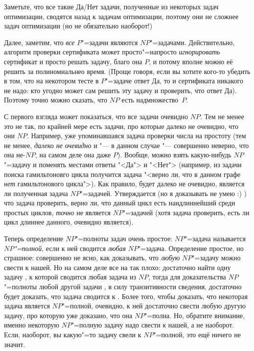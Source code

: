 {Заметьте, что все такие Да/Нет задачи, полученные из некоторых задач 
оптимизации, сводятся назад к задачам оптимизации, поэтому они не сложнее задач 
оптимизации (но не обязательно наоборот!)

Далее, заметим, что \textit{все} $P$"=задачи являются $NP$"=задачами. 
Действительно, алгоритм проверки сертификата может просто"=напросто 
\textit{игнорировать} сертификат и просто решать задачу, благо она $P$, и 
потому вполне можно её решить за полиномиальнео время. (Проще говоря, если вы 
хотите кого-то убедить в том, что на некотором тесте в $P$"=задаче ответ Да, то 
и сертификата никакого не надо: кто угодно может сам решить эту задачу и 
проверить, что ответ Да). Поэтому точно можно сказать, что $NP$ есть 
надмножество~$P$.

 С первого взгляда может показаться, что все 
задачи очевидно $NP$. Тем не менее это не так, по крайней мере есть задачи, про 
которые далеко не очевидно, что они $NP$. Например, уже упоминавшаяся задача 
проверки числа на простоту (тем не менее, \textit{далеко не очевидно} и "--- в 
данном случае "--- совершенно неверно, что она не-$NP$, на самом деле она даже $P$). 
Вообще, можно взять 
какую-нибудь $NP$"=задачу и поменять местами ответы "<Да"> и "<Нет"> 
(например, из задачи поиска гамильтоновго цикла получится задача "<верно ли, что 
в данном графе \textit{нет} гамильтонового цикла">). Как 
правило, будет далеко не очевидно, является ли полученная задача $NP$"=задачей. 
Утверждается (но я доказывать не умею :) ) что задача проверить, 
верно ли, что данный цикл есть наидлиннейший среди простых циклов, 
\textit{точно} не является $NP$"=задачей (хотя задача проверить, есть ли цикл 
длиннее данного, очевидно является).

 Теперь определение $NP$"=полноты задач очень простое: 
$NP$"=задача называется \textit{$NP$"=полной}, если к ней сводится \textit{любая} 
$NP$"=задача. Определение простое, но страшное: совершенно не ясно, как 
доказывать, что \textit{любую} $NP$"=задачу можно свести к нашей. Но на самом 
деле все на так плохо: достаточно найти одну задачу \A, к которой сводится 
любая задача из $NP$, тогда для доказательства $NP$"=полноты любой другой 
задачи \B{}, в силу транзитивности сведения, достаточно будет доказать, что задача \A{} сводится к \B. Более 
того, чтобы доказать, что некоторая задача является $NP$"=полной, очевидно, 
к ней достаточно свести любую другую задачу, про которую уже доказано, что она 
$NP$"=полна. Но, обратите внимание, именно некоторую $NP$"=полную задачу надо свести 
\textit{к} нашей, а не наоборот. Если, наоборот, вы какую"=то задачу свели к 
$NP$"=полной, это ещё ничего не значит.

}
